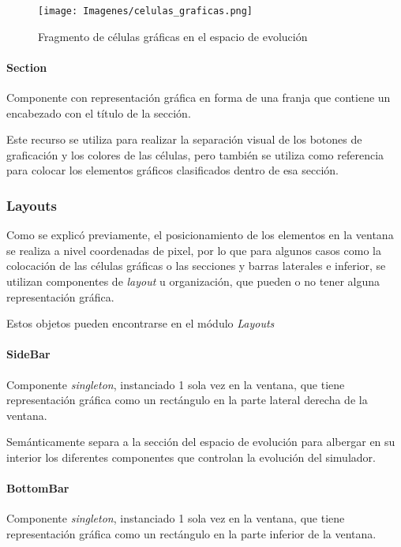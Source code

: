 \documentclass[]{article}
\begin{document}
				\begin{figure}[!h]
					\centering
					\texttt{[image: Imagenes/celulas\_graficas.png]}
					\caption{Fragmento de células gráficas en el espacio de evolución}
				\end{figure}
				
				
				\paragraph{Section}
				\justifying
				Componente con representación gráfica en forma de una franja que contiene un encabezado con el título de la sección.
				
				\hfill\break
				\justifying
				Este recurso se utiliza para realizar la separación visual de los botones de graficación y los colores de las células, pero también se utiliza como referencia para colocar los elementos gráficos clasificados dentro de esa sección.
			
			\subsubsection{Layouts}
				\justifying
				Como se explicó previamente, el posicionamiento de los elementos en la ventana se realiza a nivel coordenadas de pixel, por lo que para algunos casos como la colocación de las células gráficas o las secciones y barras laterales e inferior, se utilizan componentes de \textit{layout} u organización, que pueden o no tener alguna representación gráfica.
				
				\hfill\break
				\justifying
				Estos objetos pueden encontrarse en el módulo \textit{Layouts}
				
				\paragraph{SideBar}
				\justifying
				Componente \textit{singleton}, instanciado 1 sola vez en la ventana, que tiene representación gráfica como un rectángulo en la parte lateral derecha de la ventana.
				
				\hfill\break
				\justifying
				Semánticamente separa a la sección del espacio de evolución para albergar en su interior los diferentes componentes que controlan la evolución del simulador.
				
				\paragraph{BottomBar}
				\justifying
				Componente \textit{singleton}, instanciado 1 sola vez en la ventana, que tiene representación gráfica como un rectángulo en la parte inferior de la ventana.
				
\end{document}
